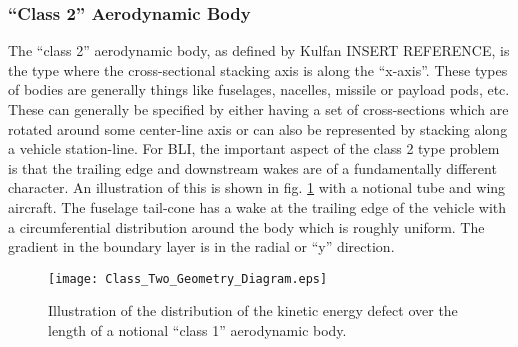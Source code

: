 					\vspace{1pt}
					\vspace{5mm}
					
				\subsubsection{``Class 2'' Aerodynamic Body}
					The ``class 2'' aerodynamic body, as defined by Kulfan INSERT REFERENCE, is the type where the cross-sectional stacking axis is along the ``x-axis''.  These types of bodies are generally things like fuselages, nacelles, missile or payload pods, etc.  These can generally be specified by either having a set of cross-sections which are rotated around some center-line axis or can also be represented by stacking along a vehicle station-line.  For BLI, the important aspect of the class 2 type problem is that the trailing edge and downstream wakes are of a fundamentally different character.  An illustration of this is shown in fig. \ref{Class_Two_Geometry_Diagram} with a notional tube and wing aircraft.  The fuselage tail-cone has a wake at the trailing edge of the vehicle with a circumferential distribution around the body which is roughly uniform.  The gradient in the boundary layer is in the radial or ``y'' direction.
					\begin{figure}[htp]
						\centering
						\texttt{[image: Class\_Two\_Geometry\_Diagram.eps]}
						\caption{Illustration of the distribution of the kinetic energy defect over the length of a notional ``class 1'' aerodynamic body.}
						\label{Class_Two_Geometry_Diagram}
					\end{figure}
					
